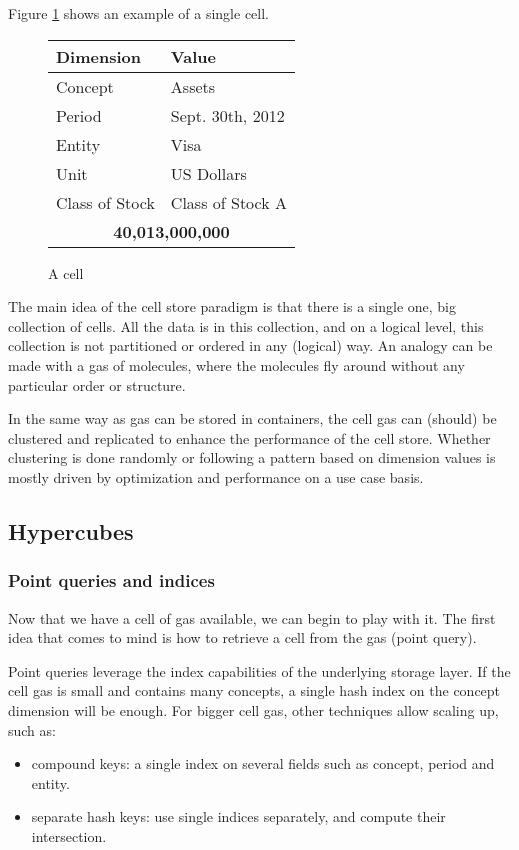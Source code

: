 \documentclass{vldb}
\begin{document}
Figure \ref{fig-cell} shows an example of a single cell.

\begin{figure}
\caption{A cell}
\label{fig-cell}
\begin{tabular}{|l|l|}
\hline
Dimension & Value \\
\hline
Concept & Assets \\
Period & Sept. 30th, 2012 \\
Entity & Visa \\
Unit & US Dollars \\
Class of Stock & Class of Stock A \\
\hline
\multicolumn{2}{|c|}{\textbf{40,013,000,000}} \\
\hline
\end{tabular}
\end{figure}

The main idea of the cell store paradigm is that there is a single one, big collection of cells. All the data is in this collection, and on a logical level, this collection is not partitioned or ordered in any (logical) way. An analogy can be made with a gas of molecules, where the molecules fly around without any particular order or structure.

In the same way as gas can be stored in containers, the cell gas can (should) be clustered and replicated to enhance the performance of the cell store. Whether clustering is done randomly or following a pattern based on dimension values is mostly driven by optimization and performance on a use case basis.

\subsection{Hypercubes}

\subsubsection{Point queries and indices}

Now that we have a cell of gas available, we can begin to play with it. The first idea that comes to mind is how to retrieve a cell from the gas (point query).

Point queries leverage the index capabilities of the underlying storage layer. If the cell gas is small and contains many concepts, a single hash index on the concept dimension will be enough. For bigger cell gas, other techniques allow scaling up, such as:
\begin{itemize}
\item compound keys: a single index on several fields such as concept, period and entity.
\item separate hash keys: use single indices separately, and compute their intersection.
\end{itemize}
\end{document}
